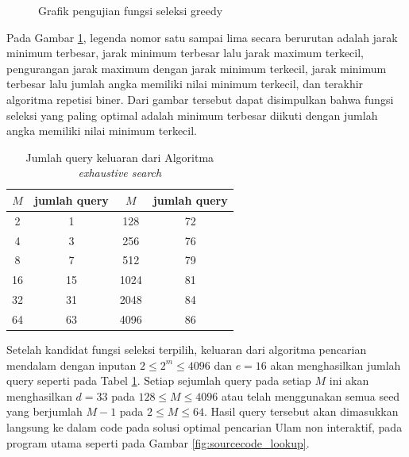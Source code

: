 \begin{figure}
\centering
{}
\caption{Grafik pengujian fungsi seleksi greedy}
\label{fig:graph_selection_function}
\end{figure}

Pada Gambar \ref{fig:graph_selection_function}, legenda nomor satu sampai lima secara berurutan adalah jarak minimum terbesar, jarak minimum terbesar lalu jarak maximum terkecil, pengurangan jarak maximum dengan jarak minimum terkecil, jarak minimum terbesar lalu jumlah angka memiliki nilai minimum terkecil, dan terakhir algoritma repetisi biner. Dari gambar tersebut dapat disimpulkan bahwa fungsi seleksi yang paling optimal adalah minimum terbesar diikuti dengan jumlah angka memiliki nilai minimum terkecil.

\begin{table}[h!]
\caption{Jumlah query keluaran dari Algoritma \textit{exhaustive search}}
\label{tab:query_count}
\begin{center}
\begin{tabular}{|c|c|c|c|}
\hline
$M$ & jumlah query & $M$ & jumlah query \\
\hline
2 & 1 & 128 & 72 \\
\hline
4 & 3 & 256 & 76 \\
\hline
8 & 7 & 512 & 79 \\
\hline
16 & 15 & 1024 & 81 \\
\hline
32 & 31 & 2048 & 84 \\
\hline
64 & 63 & 4096 & 86 \\
\hline
\end{tabular}
\end{center}
\end{table}

Setelah kandidat fungsi seleksi terpilih, keluaran dari algoritma pencarian mendalam dengan inputan $2 \leq 2^m \leq 4096$ dan $e=16$ akan menghasilkan jumlah query seperti pada Tabel \ref{tab:query_count}. Setiap sejumlah query pada setiap $M$ ini akan menghasilkan $d = 33$ pada $128 \leq M \leq 4096$ atau telah menggunakan semua seed yang berjumlah $M-1$ pada $2 \leq M \leq 64$. Hasil query tersebut akan dimasukkan langsung ke dalam code pada solusi optimal pencarian Ulam non interaktif, pada program utama seperti pada Gambar \ref{fig:sourcecode_lookup}.

